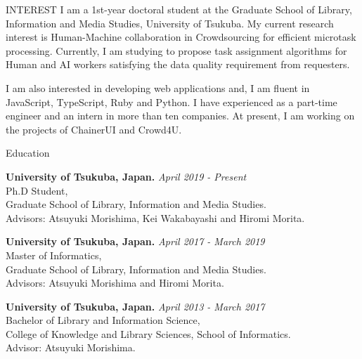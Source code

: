 \documentclass{resume} %
\begin{document}
\begin{rSection}{INTEREST}
I am a 1st-year doctoral student at the Graduate School of Library, Information and Media Studies, University of Tsukuba.
My current research interest is Human-Machine collaboration in Crowdsourcing for efficient microtask processing.
Currently, I am studying to propose task assignment algorithms for Human and AI workers satisfying the data quality requirement from requesters.
  
I am also interested in developing web applications and, I am fluent in JavaScript, TypeScript, Ruby and Python.
I have experienced as a part-time engineer and an intern in more than ten companies.
At present, I am working on the projects of ChainerUI and Crowd4U.
  


\end{rSection}


\begin{rSection}{Education}

{\bf University of Tsukuba, Japan. } \hfill {\em April 2019 - Present}
\\ Ph.D Student,
\\ Graduate School of Library, Information and Media Studies.
\\ Advisors: Atsuyuki Morishima, Kei Wakabayashi and Hiromi Morita.

{\bf University of Tsukuba, Japan. } \hfill {\em April 2017 - March 2019}
\\ Master of Informatics,
\\ Graduate School of Library, Information and Media Studies.
\\ Advisors: Atsuyuki Morishima and Hiromi Morita.

{\bf University of Tsukuba, Japan. } \hfill {\em April 2013 - March 2017} 
\\ Bachelor of Library and Information Science,
\\ College of Knowledge and Library Sciences, School of Informatics.
\\ Advisor: Atsuyuki Morishima.
\end{rSection}
\end{document}
